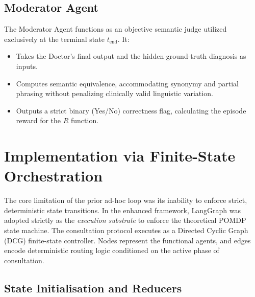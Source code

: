 \subsection{Moderator Agent}
The Moderator Agent functions as an objective semantic judge utilized exclusively at the terminal state $t_{\text{end}}$. It:
\begin{itemize}
    \item Takes the Doctor's final output and the hidden ground-truth diagnosis as inputs.
    \item Computes semantic equivalence, accommodating synonymy and partial phrasing without penalizing clinically valid linguistic variation.
    \item Outputs a strict binary (Yes/No) correctness flag, calculating the episode reward for the $R$ function.
\end{itemize}

\section{Implementation via Finite-State Orchestration}

The core limitation of the prior ad-hoc loop was its inability to enforce strict, deterministic state transitions. In the enhanced framework, LangGraph was adopted strictly as the \textit{execution substrate} to enforce the theoretical POMDP state machine. The consultation protocol executes as a Directed Cyclic Graph (DCG) finite-state controller. Nodes represent the functional agents, and edges encode deterministic routing logic conditioned on the active phase of consultation.

\subsection{State Initialisation and Reducers}

